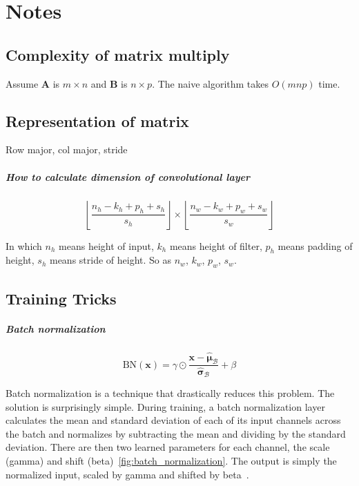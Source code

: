 \chapter{Notes}\label{chap:Notes}

\section{Complexity of matrix multiply}\label{sec:Complexity of matrix multiply}

Assume $\mathbf{A}$ is $m\times n$ and $\mathbf{B}$ is $n\times p$.
The naive algorithm takes $O\left(mnp\right)$ time.


\section{Representation of matrix}\label{sec:Representation of matrix}

Row major, col major, stride


\paragraph{How to calculate dimension of convolutional layer} %

\[ \left\lfloor \frac{n_h - k_h + p_h + s_h}{s_h} \right\rfloor \times \left\lfloor \frac{n_w - k_w + p_w + s_w}{s_w} \right\rfloor \]

In which  \(n_h\)  means height of input, \(k_h\) means height of filter, \(p_h\) means padding of height, \(s_h\) means stride of height. So as \(n_w\), \(k_w\), \(p_w\), \(s_w\).


\section{Training Tricks}\label{sec:Training Tricks}


\paragraph{Batch normalization}

\[ \textrm{BN}\left(\bm{x}\right)  = \gamma  \odot \frac{\bm{x} - \hat{\bm \mu}_\mathcal{B}}{\hat{\bm \sigma}_\mathcal{B}} + \beta
\]

Batch normalization is a technique that drastically reduces this problem.
The solution is surprisingly simple.
During training, a batch normalization layer calculates the mean and standard deviation of each of its input channels across the batch and normalizes by subtracting the mean and dividing by the standard deviation.
There are then two learned parameters for each channel, the scale (gamma) and shift (beta)~\cref{fig:batch_normalization}.
The output is simply the normalized input, scaled by gamma and shifted by beta~\cite{foster2022generative}.


